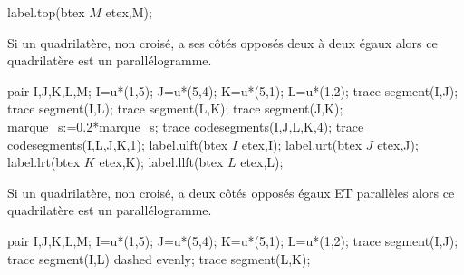 \begin{changemargin}{0mm}{-15mm}
\begin{preuve}
\begin{minipage}{7cm}
\begin{center}
\begin{Geometrie}[CoinHD={(7u,6u)}]
                    label.top(btex $M$ etex,M);
                \end{Geometrie}  
            \end{center}
        \end{minipage}
    \end{preuve}
    \begin{propriete}
        \begin{minipage}{0.65\linewidth}    
            Si un quadrilatère, non croisé, a ses côtés opposés deux à deux égaux alors ce quadrilatère est un parallélogramme.
        \end{minipage}
        \begin{minipage}{0.35\linewidth}    
            \begin{Geometrie}[CoinHD={(7u,6u)}]
                pair I,J,K,L,M;
                I=u*(1,5);
                J=u*(5,4);
                K=u*(5,1);
                L=u*(1,2);
                trace segment(I,J);
                trace segment(I,L);
                trace segment(L,K);
                trace segment(J,K);
                marque_s:=0.2*marque_s;
                trace codesegments(I,J,L,K,4);
                trace codesegments(I,L,J,K,1);
                label.ulft(btex $I$ etex,I);
                label.urt(btex $J$ etex,J);
                label.lrt(btex $K$ etex,K);
                label.llft(btex $L$ etex,L);
            \end{Geometrie} 
        \end{minipage}
    \end{propriete}
    \begin{propriete}
        \begin{minipage}{0.65\linewidth}    
            Si un quadrilatère, non croisé, a deux côtés opposés égaux ET parallèles alors ce quadrilatère est un parallélogramme.
        \end{minipage}
        \begin{minipage}{0.35\linewidth}    
            \begin{Geometrie}[CoinHD={(7u,6u)}]
                pair I,J,K,L,M;
                I=u*(1,5);
                J=u*(5,4);
                K=u*(5,1);
                L=u*(1,2);
                trace segment(I,J);
                trace segment(I,L) dashed evenly;
                trace segment(L,K);

\end{Geometrie}
\end{minipage}
\end{propriete}
\end{changemargin}
